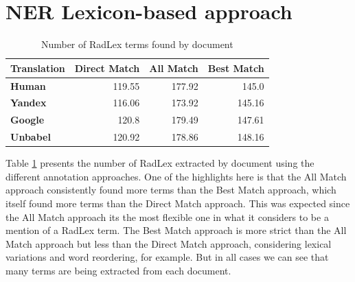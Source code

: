 \label{chap4}





\section{NER Lexicon-based approach}

\begin{table}[ht]
    \centering
    \begin{tabular}{lrrr}
    \toprule
    \textbf{Translation}   &   \textbf{Direct Match} &   \textbf{All Match} &   \textbf{Best Match} \\
    \midrule
     \textbf{Human}         &         119.55 &      177.92 &       145.0 \\

     \textbf{Yandex}        &         116.06 &      173.92 &       145.16 \\

     \textbf{Google}        &         120.8 &      179.49 &       147.61 \\

     \textbf{Unbabel}       &         120.92 &      178.86 &       148.16 \\

    \bottomrule
    \end{tabular} 
    \caption{Number of RadLex terms found by document}
    \label{table:terms_by_document}
\end{table}

Table \ref{table:terms_by_document} presents the number of RadLex extracted by document using the different annotation approaches. One of the highlights here is that the All Match approach consistently found more terms than the Best Match approach, which itself found more terms than the Direct Match approach. This was expected since the All Match approach its the most flexible one in what it considers to be a mention of a RadLex term. The Best Match approach is more strict than the All Match approach but less than the Direct Match approach, considering lexical variations and word reordering, for example. But in all cases we can see that many terms are being extracted from each document.


